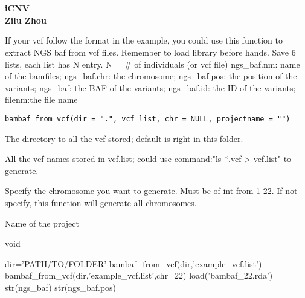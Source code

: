 \documentclass[a4paper]{book}
\begin{document}
\chapter*{}
\begin{center}
{\textbf{\huge iCNV\\ Zilu Zhou}}
\par\bigskip{\large \today}
\end{center}
%
\begin{Description}\relax
If your vcf follow the format in the example, you could use this function to extract NGS baf from vcf files. Remember to load library before hands.
Save 6 lists, each list has N entry. N = \# of individuals (or vcf file)
ngs\_baf.nm: name of the bamfiles; ngs\_baf.chr: the chromosome; ngs\_baf.pos: the position of the variants;
ngs\_baf: the BAF of the variants; ngs\_baf.id: the ID of the variants; filenm:the file name
\end{Description}
%
\begin{Usage}
\begin{verbatim}
bambaf_from_vcf(dir = ".", vcf_list, chr = NULL, projectname = "")
\end{verbatim}
\end{Usage}
%
\begin{Arguments}
\begin{ldescription}
\item[\code{dir}] The directory to all the vcf stored; default is right in this folder.

\item[\code{vcf\_list}] All the vcf names stored in vcf.list; could use command:"ls *.vcf > vcf.list" to generate.

\item[\code{chr}] Specify the chromosome you want to generate. Must be of int from 1-22. If not specify, this function will generate all chromosomes.

\item[\code{projectname}] Name of the project
\end{ldescription}
\end{Arguments}
%
\begin{Value}
void
\end{Value}
%
\begin{Examples}
\begin{ExampleCode}
dir='PATH/TO/FOLDER'
bambaf_from_vcf(dir,'example_vcf.list')
bambaf_from_vcf(dir,'example_vcf.list',chr=22)
load('bambaf_22.rda')
str(ngs_baf)
str(ngs_baf.pos)
\end{ExampleCode}
\end{Examples}
\end{document}
